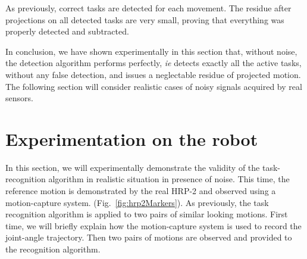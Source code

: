 \documentclass[letterpaper, 10pt, conference]{ieeeconf}      %
\begin{document}
As previously, correct tasks are detected for each movement. The residue after projections on all detected
tasks are very small, proving that everything was properly detected and subtracted.

In conclusion, we have shown experimentally in this section that, without noise, the detection algorithm
performs perfectly, \emph{ie} detects exactly all the active tasks, without any  false detection,
and issues a neglectable residue of projected motion. The following section will consider
realistic cases of noisy signals acquired by real sensors.

\section{Experimentation on the robot}
\label{sec:real}
In this section, we will experimentally demonstrate the validity of the task-recognition algorithm
in realistic situation in presence of noise. This time, the reference motion 
is demonstrated by the real HRP-2 and observed 
using a motion-capture system. (Fig.~\ref{fig:hrp2Markers}).
As previously, the task recognition algorithm is applied to two pairs of similar looking motions.
First time, we will briefly explain how the motion-capture system is used to record the joint-angle 
trajectory. Then two pairs of motions are observed and provided to the recognition algorithm.
\end{document}
